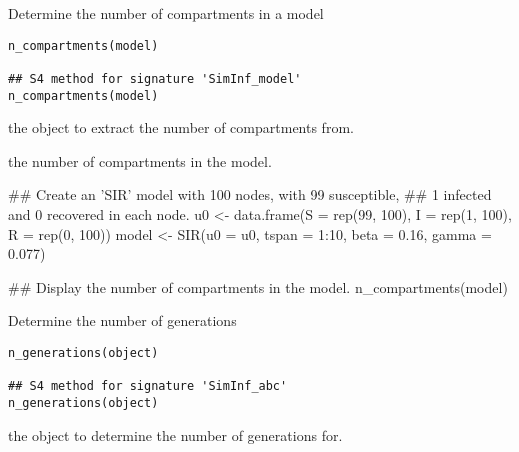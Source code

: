 \documentclass[letterpaper]{book}
\begin{document}
%
\begin{Description}
Determine the number of compartments in a model
\end{Description}
%
\begin{Usage}
\begin{verbatim}
n_compartments(model)

## S4 method for signature 'SimInf_model'
n_compartments(model)
\end{verbatim}
\end{Usage}
%
\begin{Arguments}
\begin{ldescription}
\item[\code{model}] the  object to extract the number of
compartments from.
\end{ldescription}
\end{Arguments}
%
\begin{Value}
the number of compartments in the model.
\end{Value}
%
\begin{Examples}
\begin{ExampleCode}
## Create an 'SIR' model with 100 nodes, with 99 susceptible,
## 1 infected and 0 recovered in each node.
u0 <- data.frame(S = rep(99, 100), I = rep(1, 100), R = rep(0, 100))
model <- SIR(u0 = u0, tspan = 1:10, beta = 0.16, gamma = 0.077)

## Display the number of compartments in the model.
n_compartments(model)
\end{ExampleCode}
\end{Examples}
%
\begin{Description}
Determine the number of generations
\end{Description}
%
\begin{Usage}
\begin{verbatim}
n_generations(object)

## S4 method for signature 'SimInf_abc'
n_generations(object)
\end{verbatim}
\end{Usage}
%
\begin{Arguments}
\begin{ldescription}
\item[\code{object}] the  object to determine the number
of generations for.
\end{ldescription}
\end{Arguments}
\end{document}
